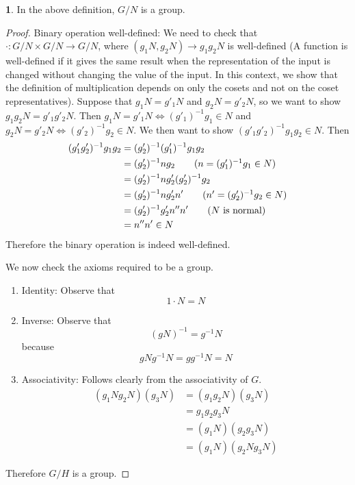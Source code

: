 \documentclass[12pt]{article}
\theoremstyle{definition}
\newtheorem{theorem}{\color{ForestGreen}{\textbf{Theorem}}}
\theoremstyle{definition}
\begin{document}
\begin{theorem}
In the above definition, $G/N$ is a group. 
\end{theorem}
\begin{proof}
Binary operation well-defined: We need to check that $\cdot: G/N \times G/N \to G/N$, where $(g_1N, g_2N) \to g_1 g_2 N$ is well-defined (A function is well-defined if it gives the same result when the representation of the input is changed without changing the value of the input. In this context, we show that the definition of multiplication depends on only the cosets and not on the coset representatives). Suppose that $g_1 N = g'_1 N$ and $g_2 N = g'_2 N$, so we want to show $g_1 g_2 N = g'_1 g'_2 N$. Then $g_1N = g'_1 N \iff (g'_1)^{-1} g_1 \in N$ and $g_2 N = g'_2 N \iff (g'_2)^{-1} g_2 \in N$. We then want to show $(g'_1g'_2)^{-1}g_1g_2 \in N$. Then
\begin{align*}
	(g'_1g'_2)^{-1}g_1g_2 &= (g'_2)^{-1} (g'_1)^{-1} g_1 g_2 \\
	&= (g'_2)^{-1} n g_2 \tag{$n = (g'_1)^{-1} g_1 \in N$} \\
	&= (g'_2)^{-1} n g'_2 (g'_2)^{-1} g_2 \\
	&= (g'_2)^{-1} n g'_2 n' \tag{$n' = (g'_2)^{-1} g_2 \in N$}\\
	&= (g'_2)^{-1} g'_2 n'' n' \tag{$N$ is normal}\\
	&= n'' n' \in N
\end{align*}
Therefore the binary operation is indeed well-defined. 

We now check the axioms required to be a group.

\begin{enumerate}
	\item Identity: Observe that
	\begin{equation}
		1 \cdot N = N
	\end{equation}

	\item Inverse: Observe that
	\begin{equation}
		(gN)^{-1} = g^{-1}N
	\end{equation}
	because 
	\begin{equation}
		gNg^{-1}N = gg^{-1} N = N
	\end{equation}

	\item Associativity: Follows clearly from the associativity of $G$. 
	\begin{align*}
		(g_1 N g_2 N)(g_3 N) &= (g_1 g_2 N)(g_3 N) \\
		&= g_1 g_2 g_3 N \\
		&= (g_1 N) (g_2 g_3 N) \\
		&= (g_1 N)(g_2 N g_3 N)
	\end{align*}
\end{enumerate}

Therefore $G/H$ is a group. 
\end{proof}
\end{document}
